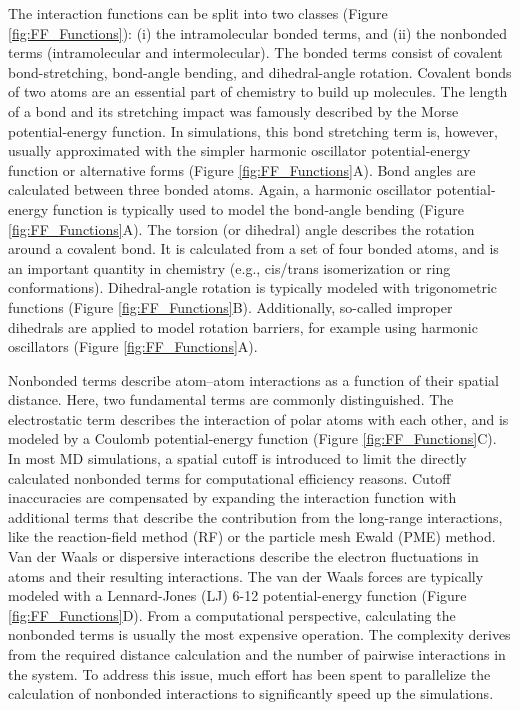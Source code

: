 The interaction functions can be split into two classes (Figure \ref{fig:FF_Functions}): (i) the intramolecular bonded terms, and (ii) the nonbonded terms (intramolecular and intermolecular).\cite{Weiner1984, Riniker2018}
The bonded terms consist of covalent bond-stretching, bond-angle bending, and dihedral-angle rotation.
Covalent bonds of two atoms are an essential part of chemistry to build up molecules. \cite{Pauling1934} The length of a bond and its stretching impact was famously described by the Morse potential-energy function. \cite{Morse1929, Iozzi2009} In simulations, this bond stretching term is, however, usually approximated with the simpler harmonic oscillator potential-energy function or alternative forms (Figure \ref{fig:FF_Functions}A).\cite{Gunsteren1996} Bond angles are calculated between three bonded atoms. \cite{Pauling1931, Slater1931}
Again, a harmonic oscillator potential-energy function is typically used to model the bond-angle bending (Figure \ref{fig:FF_Functions}A). 
The torsion (or dihedral) angle describes the rotation around a covalent bond. \cite{Blondel1996} It is calculated from a set of four bonded atoms, and is an important quantity in chemistry (e.g., cis/trans isomerization \cite{Dugave2003} or ring conformations\cite{Strauss1970}). Dihedral-angle rotation is typically modeled with trigonometric functions (Figure \ref{fig:FF_Functions}B).
Additionally, so-called improper dihedrals are applied to model rotation barriers, for example using harmonic oscillators (Figure \ref{fig:FF_Functions}A).\cite{Blondel1996}

Nonbonded terms describe atom--atom interactions as a function of their spatial distance. Here, two fundamental terms are commonly distinguished.
The electrostatic term describes the interaction of polar atoms with each other, and is modeled by a Coulomb potential-energy function (Figure \ref{fig:FF_Functions}C). \cite{Gillmor2017, Atkins2014} In most MD simulations, a spatial cutoff is introduced to limit the directly calculated nonbonded terms for computational efficiency reasons. Cutoff inaccuracies are compensated by expanding the interaction function with additional terms that describe the contribution from the long-range interactions, like the reaction-field method (RF) \cite{Tironi1995} or the particle mesh Ewald (PME) \cite{Darden1993} method.
Van der Waals or dispersive interactions describe the electron fluctuations in atoms and their resulting interactions.\cite{Kawai2016, Margenau1939} The van der Waals forces \cite{Margenau1939} are typically modeled with a Lennard-Jones (LJ)\cite{Jones1924} 6-12 potential-energy function (Figure \ref{fig:FF_Functions}D).
From a computational perspective, calculating the nonbonded terms is usually the most expensive operation. The complexity derives from the required distance calculation and the number of pairwise interactions in the system. To address this issue, much effort has been spent to parallelize the calculation of nonbonded interactions to significantly speed up the simulations.\cite{Berendsen1995, Schmid2012, Eastman2010, Meel2008}

